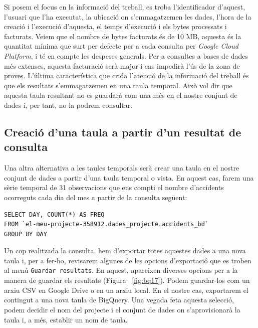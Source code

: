\documentclass[11pt,longbibliography]{article}
\theoremstyle{definition}
\theoremstyle{remark}
\begin{document}
Si posem el focus en la informació del treball, es troba l'identificador d'aquest, l'usuari que l'ha executat, la ubicació on s'emmagatzemen les dades, l'hora de la creació i l'execució d'aquesta, el temps d'execució i els bytes processats i facturats. Veiem que el nombre de bytes facturats és de 10 MB, aquesta és la quantitat mínima que surt per defecte per a cada consulta per \textit{Google Cloud Platform}, i té en compte les despeses generals. Per a consultes a bases de dades més extenses, aquesta facturació serà major i ens impedirà l'ús de la zona de proves. L'última característica que crida l'atenció de la informació del treball és que els resultats s'emmagatzemen en una taula temporal. Això vol dir que aquesta taula resultant no es guardarà com una més en el nostre conjunt de dades i, per tant, no la podrem consultar.



\subsection{Creació d'una taula a partir d'un resultat de consulta}

Una altra alternativa a les taules temporals serà crear una taula en el nostre conjunt de dades a partir d'una taula temporal o vista. En aquest cas, farem una sèrie temporal de 31 observacions que ens compti el nombre d'accidents ocorreguts cada dia del mes a partir de la consulta següent:

\begin{verbatim}
SELECT DAY, COUNT(*) AS FREQ
FROM `el-meu-projecte-358912.dades_projecte.accidents_bd`
GROUP BY DAY
\end{verbatim}

Un cop realitzada la consulta, hem d'exportar totes aquestes dades a una nova taula i, per a fer-ho, revisarem algunes de les opcions d'exportació que es troben al menú \verb|Guardar resultats|. En aquest, apareixen diverses opcions per a la manera de guardar els resultats (Figura ~\ref{fig:bq17}). Podem guardar-los com un arxiu CSV en Google Drive o en un arxiu local. En el nostre cas, exportarem el contingut a una nova taula de BigQuery. Una vegada feta aquesta selecció, podem decidir el nom del projecte i el conjunt de dades on s'aprovisionarà la taula i, a més, establir un nom de taula. 
\end{document}
